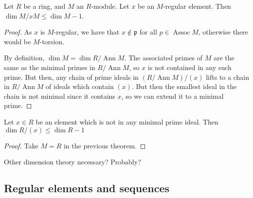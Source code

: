 %

\newcommand{\Assoc}{\operatorname{Assoc}}
\newcommand{\Ann}{\operatorname{Ann}}

\begin{theorem}
    \label{thm:quotient_regular_sub_dim_1}
    Let \(R\) be a ring, and \(M\) an \(R\)-module.
    Let \(x\) be an \(M\)-regular element.
    Then \(\dim M / xM \leq \dim M - 1\).
\end{theorem}

\begin{proof}
    As \(x\) is \(M\)-regular, we have that
    \(x \notin \mathfrak{p}\) for all
    \(p \in  \Assoc M\),
    otherwise there would be \(M\)-torsion.
    
    By definition, \(\dim M = \dim R / \Ann M\).
    The associated primes of \(M\) are the same
    as the minimal primes in \(R / \Ann M\),
    so \(x\) is not contained in any such prime.
    But then, any chain of prime ideals in 
    \((R / \Ann M) / (x)\) lifts to a chain in
    \(R / \Ann M\) of ideals which contain \((x)\).
    But then the smallest ideal in the chain 
    is not minimal since it contains \(x\), so
    we can extend it to a minimal prime.
\end{proof}

\begin{corollary}
  \label{cor:quotient_non_minimal_sub_dim_1}
  Let $x \in R$ be an element which is not in any 
  minimal prime ideal.
  Then $\dim R / (x) \leq \dim R - 1$
\end{corollary}

\begin{proof}

  Take $M = R$ in the previous theorem.
\end{proof}


Other dimension theory necessary? Probably?

\subsection{Regular elements and sequences}

